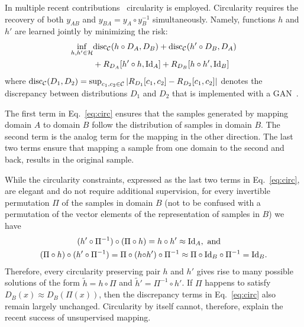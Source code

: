 \documentclass{article} %
\newcommand{\Id}{\textnormal{Id}}
\newcommand{\disc}{\textnormal{disc}}
\begin{document}
In multiple recent contributions~\citep{xia2016dual,discogan,CycleGAN2017,dualgan} circularity is employed. Circularity requires the recovery of both $y_{AB}$ and $y_{BA} = y_A \circ y_B^{-1}$ simultaneously. Namely, functions $h$ and $h'$ are learned jointly by minimizing the risk:
\begin{equation}
\label{eq:circ}
\begin{aligned}
\inf_{h,h'\in \mathcal{H}} &\disc_{\mathcal{C}}(h\circ D_A,D_B) + \disc_{\mathcal{C}}(h'\circ D_B,D_A) \\
&+ R_{D_A}[h'\circ h,\Id_A] + R_{D_B}[h\circ h',\Id_B]
\end{aligned}
\end{equation} 
where $\disc_{\mathcal{C}}(D_1,D_2)=\sup_{c_1,c_2 \in \mathcal{C}} |R_{D_1}[c_1,c_2] - R_{D_2}[c_1,c_2]|$ denotes the discrepancy between distributions $D_1$ and $D_2$ that is implemented with a GAN~\citep{Ganin:2016:DTN:2946645.2946704}.   

The first term in Eq.~\ref{eq:circ} ensures that the samples generated by mapping domain $A$ to domain $B$ follow the distribution of samples in domain $B$. The second term is the analog term for the mapping in the other direction. The last two terms ensure that mapping a sample from one domain to the second  and back, results in the original sample. 

While the circularity constraints, expressed as the last two terms in Eq.~\ref{eq:circ}, are elegant and do not require additional supervision, for every invertible permutation $\Pi$ of the samples in domain $B$ (not to be confused with a permutation of the vector elements of the representation of samples in $B$) we have 
\begin{equation}
\label{eq:Pi}
\begin{aligned}
(h' \circ \Pi^{-1})\circ (\Pi \circ h )   &= h\circ h' \approx \Id_A,\text{  and} \\
 (\Pi \circ h ) \circ (h' \circ \Pi^{-1}) = \Pi \circ (h\circ & h') \circ \Pi^{-1} \approx  \Pi \circ \Id_B \circ \Pi^{-1} = \Id_B.
\end{aligned}
\end{equation}
Therefore, every circularity preserving pair $h$ and $h'$ gives rise to many possible solutions of the form $\tilde h = h \circ \Pi$ and $\tilde h' = \Pi^{-1} \circ h'$. If $\Pi$ happens to satisfy $D_B(x) \approx D_B(\Pi(x))$, then the discrepancy terms in Eq.~\ref{eq:circ} also remain largely unchanged. Circularity by itself cannot, therefore, explain the recent success of unsupervised mapping.
\end{document}
